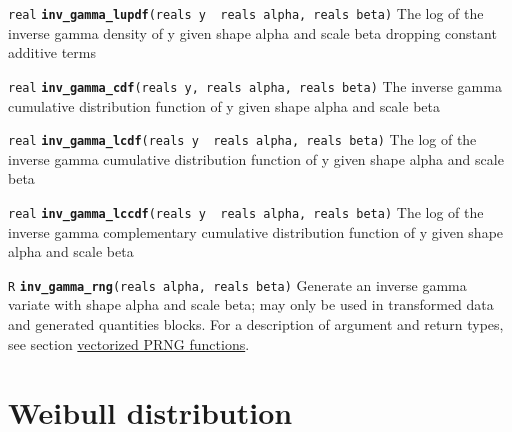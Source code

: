 \documentclass[
  10pt,
]{book}
\begin{document}

\texttt{real} \textbf{\texttt{inv\_gamma\_lupdf}}\texttt{(reals\ y\ \textbar{}\ reals\ alpha,\ reals\ beta)}\newline
The log of the inverse gamma density of y given shape alpha and scale
beta dropping constant additive terms


\texttt{real} \textbf{\texttt{inv\_gamma\_cdf}}\texttt{(reals\ y,\ reals\ alpha,\ reals\ beta)}\newline
The inverse gamma cumulative distribution function of y given shape
alpha and scale beta


\texttt{real} \textbf{\texttt{inv\_gamma\_lcdf}}\texttt{(reals\ y\ \textbar{}\ reals\ alpha,\ reals\ beta)}\newline
The log of the inverse gamma cumulative distribution function of y
given shape alpha and scale beta


\texttt{real} \textbf{\texttt{inv\_gamma\_lccdf}}\texttt{(reals\ y\ \textbar{}\ reals\ alpha,\ reals\ beta)}\newline
The log of the inverse gamma complementary cumulative distribution
function of y given shape alpha and scale beta


\texttt{R} \textbf{\texttt{inv\_gamma\_rng}}\texttt{(reals\ alpha,\ reals\ beta)}\newline
Generate an inverse gamma variate with shape alpha and scale beta; may
only be used in transformed data and generated quantities blocks.
For a description of argument and return types, see section
\protect\hyperlink{prng-vectorization}{vectorized PRNG functions}.

\hypertarget{weibull-distribution}{%
\section{Weibull distribution}\label{weibull-distribution}}
\end{document}
